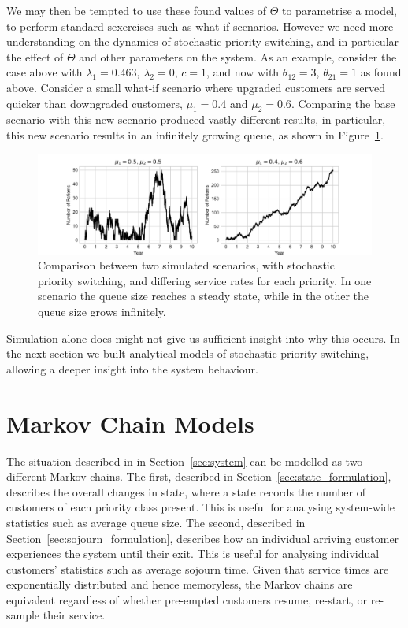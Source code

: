 \documentclass{article}
\begin{document}
We may then be tempted to use these found values of $\Theta$ to parametrise a
model, to perform standard sexercises such as what if scenarios. However we need
more understanding on the dynamics of stochastic priority switching, and in
particular the effect of $\Theta$ and other parameters on the system. As an 
example, consider the case above with $\lambda_1 = 0.463$, $\lambda_2 = 0$,
$c = 1$, and now with $\theta_{12}=3$, $\theta_{21}=1$ as found above. Consider
a small what-if scenario where upgraded customers are served quicker than
downgraded customers, $\mu_1 = 0.4$ and $\mu_2 = 0.6$. Comparing the base
scenario with this new scenario produced vastly different results, in
particular, this new scenario results in an infinitely growing queue, as shown
in Figure~\ref{fig:toy_scenario}.

\begin{figure}
  \begin{center}
    \includegraphics[width=\textwidth]{img/adjust_service_rate.pdf}
  \end{center}
  \caption{Comparison between two simulated scenarios, with stochastic priority
  switching, and differing service rates for each priority. In one scenario the
  queue size reaches a steady state, while in the other the queue size grows
  infinitely.}
  \label{fig:toy_scenario}
\end{figure}

Simulation alone does might not give us sufficient insight into why this occurs.
In the next section we built analytical models of stochastic priority switching,
allowing a deeper insight into the system behaviour.


\section{Markov Chain Models}\label{sec:makovchains}
The situation described in in Section~\ref{sec:system} can be modelled as two
different Markov chains.
The first, described in Section~\ref{sec:state_formulation}, describes the
overall changes in state, where a state records the number of customers of each
priority class present. This is useful for analysing system-wide statistics such
as average queue size.
The second, described in Section~\ref{sec:sojourn_formulation}, describes how an
individual arriving customer experiences the system until their exit. This is
useful for analysing individual customers' statistics such as average sojourn
time.
Given that service times are exponentially distributed and hence memoryless, the
Markov chains are equivalent regardless of whether pre-empted customers resume,
re-start, or re-sample their service.
\end{document}
